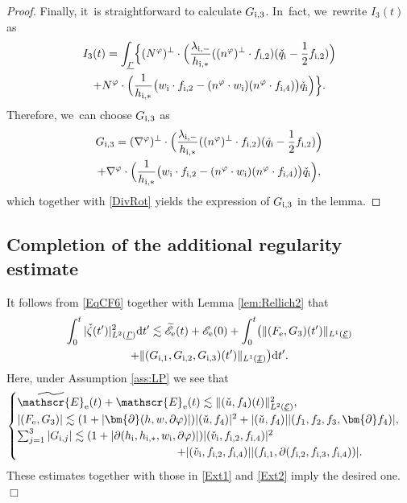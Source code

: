 \documentclass[10pt]{amsart}
\newcommand{\cI}{{\mathcal I}}
\newcommand{\cE}{{\mathcal E}}
\newcommand{\ul}[1]{\underline{#1}}
\newcommand{\itGamma}{\mathit{\Gamma}}
\theoremstyle{definition}
\begin{document}
\begin{proof}
Finally, it~is straightforward to calculate $G_{{\rm i},3}$. In~fact, we~rewrite $I_3(t)$ as
\begin{multline*}
I_3(t)
= \int_{\ul{\itGamma}}\Bigl\{
(N^\varphi)^\perp\cdot \Bigl(\frac{\lambda_{{\rm i},-}}{h_{{\rm i},*}} ((n^\varphi)^\perp\cdot f_{{\rm i},2})(\check{q}_\mathrm{i}-\frac12 f_{{\rm i},2}) \Bigr) \\
+ N^\varphi\cdot \Bigl(\frac{1}{h_{{\rm i},*}}\bigl(w_\mathrm{i}\cdot f_{{\rm i},2}-(n^\varphi\cdot w_\mathrm{i})(n^\varphi\cdot f_{{\rm i},4})
\bigr) \check{q}_\mathrm{i} \Bigr) \Bigr\}.
\end{multline*}
Therefore, we~can choose $G_{{\rm i},3}$ as
\begin{multline*}
G_{{\rm i},3}
= (\nabla^\varphi)^\perp\cdot \Bigl(\frac{\lambda_{{\rm i},-}}{h_{{\rm i},*}} ((n^\varphi)^\perp\cdot f_{{\rm i},2})
(\check{q}_\mathrm{i}-\frac12 f_{{\rm i},2}) \Bigr) \\
+ \nabla^\varphi\cdot \Bigl(\frac{1}{h_{{\rm i},*}}
\bigl(w_\mathrm{i}\cdot f_{{\rm i},2}-(n^\varphi\cdot w_\mathrm{i})(n^\varphi\cdot f_{{\rm i},4}) \bigr)\check{q}_\mathrm{i} \Bigr),
\end{multline*}
which together with \eqref{DivRot} yields the expression of $G_{{\rm i},3}$ in the lemma.
\end{proof}

\subsection{Completion of the additional regularity estimate}
It follows from \eqref{EqCF6} together with Lemma \ref{lem:Rellich2} that
\begin{multline*}
\int_0^t|\check{\zeta}(t')|_{L^2(\ul{\itGamma})}^2\mathrm{d}t'
\lesssim \widetilde{\mathscr{E}}_\mathrm{e}(t) + \mathscr{E}_\mathrm{e}(0) + \int_0^t \bigl(\|(F_\mathrm{e},G_3)(t')\|_{L^1(\ul{\cE})} \\
+ \|(G_{{\rm i},1},G_{{\rm i},2},G_{{\rm i},3})(t')\|_{L^1(\ul{\cI})} \bigr){\rm d}t'.
\end{multline*}
Here, under Assumption \ref{ass:LP} we see that
\[
\begin{cases}
\widetilde{\mathscr{E}}_\mathrm{e}(t) + \mathscr{E}_\mathrm{e}(t) \lesssim \|(\check{u},f_4)(t)\|_{L^2(\ul{\cE})}^2, \\
|(F_\mathrm{e},G_3)| \lesssim (1+|\bm{\partial}(h,w,\partial\varphi)|)|(\check{u},f_4)|^2 + |(\check{u},f_4)||(f_1,f_2,f_3,\bm{\partial}f_4)|, \\
\sum_{j=1}^3|G_{{\rm i},j}| \lesssim (1+|\partial(h_\mathrm{i},h_{{\rm i},*},w_\mathrm{i},\partial\varphi)|)|(\check{v}_\mathrm{i},f_{{\rm i},2},f_{{\rm i},4})|^2 \\
\hspace*{5cm}
+ |(\check{v}_\mathrm{i},f_{{\rm i},2},f_{{\rm i},4})||(f_{{\rm i},1},\partial(f_{{\rm i},2},f_{{\rm i},3},f_{{\rm i},4}))|.
\end{cases}
\]
These estimates together with those in \eqref{Ext1} and \eqref{Ext2} imply the desired one.
\hfill$\Box$
\end{document}
